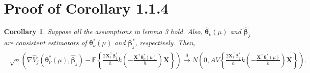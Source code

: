 \documentclass[12pt]{article}
\newcommand{\wh}{\widehat}
\newcommand{\itl}{\intercal}
\newcommand{\bs}{ \boldsymbol}
\newcommand{\lt}{\left}
\newcommand{\rt}{\right}
\newtheorem{corollary}[theorem]{Corollary}
\begin{document}
\section{Proof of Corollary 1.1.4}
\begin{corollary}
	Suppose all the assumptions in lemma 3 hold. Also, $\wh{\bs{\theta}}_{\nu}\lt(\mu\rt)$ and $\widehat{\bs{\beta}}_{j}$ are consistent estimators of $\bs{\theta}^*_{\nu}\lt(\mu\rt)$ and $\bs{\beta}_{j}^*$, respectively. Then, 
	\begin{gather}
	\begin{flalign*}
	\sqrt{n}\lt(\nabla\wh{V}_j\lt(\bs{\theta}^*_{\nu}\lt(\mu\rt)  , \wh{\bs{\beta}}_j\rt) - \mathbb{E}\lt\{\frac{2\bs{X}_{1}^{\intercal}\bs{\beta}^*_j}{h}k\lt(-\frac{\bs{X}^{\intercal}\bs{\theta}^*_{\nu}\lt(\mu\rt)}{h}\rt)\bs{X}\rt\}\rt)\overset{d}{\to}N\lt(0,AV\lt\{\frac{2\bs{X}_1^{\itl}\bs{\beta}^*_j}{h}k\lt(-\frac{\bs{X}^{\itl}\bs{\theta}^*_{\nu}\lt(\mu\rt)}{h}\rt)\bs{X}\rt\}\rt).
	\end{flalign*}
	\end{gather}
\end{corollary}
\end{document}
